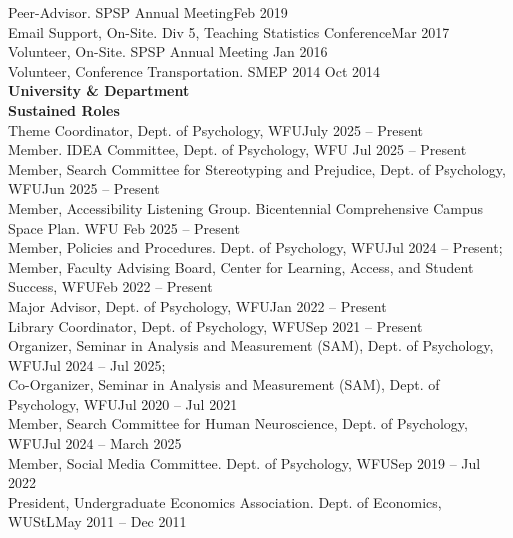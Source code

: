 Peer-Advisor. SPSP Annual Meeting\hfill{Feb 2019}\\
Email Support, On-Site. Div 5, Teaching Statistics Conference\hfill{Mar 2017}\\
Volunteer, On-Site. SPSP Annual Meeting \hfill{Jan 2016}\\
Volunteer, Conference Transportation. SMEP 2014  \hfill{Oct 2014}\medskip\\
{\large \textbf{University \& Department}}\\
\textrm{\textbf{Sustained Roles}}\\
Theme Coordinator, Dept. of Psychology, WFU\hfill {July 2025 – Present}\\
Member. IDEA Committee, Dept. of Psychology, WFU \hfill{Jul 2025 – Present}\\ %
Member, Search Committee for Stereotyping and Prejudice, Dept. of Psychology, WFU\hfill {Jun 2025 – Present}\\
Member, Accessibility Listening Group. \small{Bicentennial Comprehensive Campus Space Plan}. WFU \hfill{Feb 2025 – Present}\\ %
Member, Policies and Procedures. Dept. of Psychology, WFU\hfill{Jul 2024 – Present;}\newline
{}\\
Member, Faculty Advising Board, Center for Learning, Access, and Student Success, WFU\hfill {Feb 2022 – Present}\\
Major Advisor, Dept. of Psychology, WFU\hfill{Jan 2022 – Present}\\
Library Coordinator, Dept. of Psychology, WFU\hfill {Sep 2021 – Present}\\
Organizer, Seminar in Analysis and Measurement (SAM), Dept. of Psychology, WFU\hfill{Jul 2024 – Jul 2025;}\newline
{}\\
Co-Organizer, Seminar in Analysis and Measurement (SAM), Dept. of Psychology, WFU\hfill {Jul 2020 – Jul 2021}\\
Member, Search Committee for Human Neuroscience, Dept. of Psychology, WFU\hfill {Jul 2024 – March 2025}\\
Member, Social Media Committee. Dept. of Psychology, WFU\hfill {Sep 2019 – Jul 2022}\\
President, Undergraduate Economics Association. Dept. of Economics, WUStL\hfill{May 2011 – Dec 2011}\\
